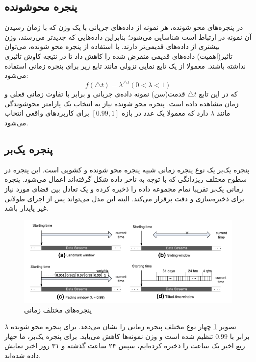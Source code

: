\subsection{پنجره محوشونده}
در پنجره‌های محو شونده، هر نمونه از داده‌های جریانی با یک وزن که با زمان رسیدن آن نمونه در ارتباط است شناسایی می‌شود؛ بنابراین داده‌هایی که جدیدتر می‌رسند، وزن بیشتری از داده‌های قدیمی‌تر دارند\cite{leite2009evolving}. با استفاده از پنجره محو شونده، می‌توان تاثیر(اهمیت) داده‌های قدیمی منقرض شده را کاهش داد تا در نتیجه کاوش تاثیری نداشته باشند. معمولا از یک تابع نمایی نزولی مانند تابع زیر برای پنجره زمانی استفاده می‌شود:
$$
f(\triangle t) = \lambda^{\triangle t}(0 < \lambda < 1)
$$
که در این تابع $\triangle t$ قدمت(سن) نمونه داده‌ی جریانی و برابر با تفاوت زمانی فعلی و زمان مشاهده داده است. پنجره محو شونده نیاز به انتخاب یک پارامتر محوشوندگی مانند $ \lambda $ دارد که معمولا یک عدد در بازه $ [0.99, 1] $ برای کاربردهای واقعی انتخاب می‌شود\cite{Nguyen2015}.


\subsection{پنجره یک‌بر}
پنجره یک‌بر یک نوع پنجره زمانی شبیه پنجره محو شونده و کشویی است\cite{aggarwal2006framework}. این پنجره در سطوح مختلف ریزدانگی که با توجه به تاخر داده شکل گرفته‌اند اعمال می‌شود. پنجره زمانی‌ یک‌بر تقریبا تمام مجموعه داده را ذخیره کرده و یک تعادل بین فضای مورد نیاز برای ذخیره‌سازی و دقت برقرار می‌کند. البته این‌ مدل می‌تواند پس از اجرای طولانی غیر پایدار باشد.



\begin{figure}%
\centerline{\includegraphics[width=15cm]{time-windows}}
\caption{پنجره‌های مختلف زمانی}
\label{fig:time-windows}
\end{figure}
تصویر
\ref{fig:time-windows}\cite{Nguyen2015}
چهار نوع مختلف پنجره زمانی را نشان می‌دهد. برای پنجره محو شونده $\lambda$ برابر با $0.99$ تنظیم شده است و وزن نمونه‌ها کاهش می‌یابد. برای پنجره یک‌بر، ما جهار ربع اخیر یک ساعت را ذخیره کرده‌ایم، سپس ۲۴ ساعت گذشته و ۳۱ روز اخیر نمایش داده شده‌اند.



